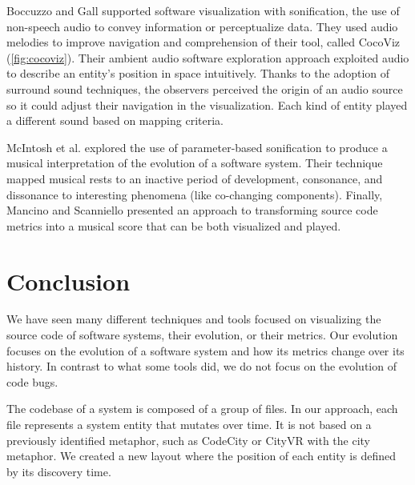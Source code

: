 Boccuzzo and Gall \cite{Boccuzzo2009} supported software visualization with sonification, the use of non-speech audio to convey information or perceptualize data. 
They used audio melodies to improve navigation and comprehension of their tool, called CocoViz (\autoref{fig:cocoviz}).
Their ambient audio software exploration approach exploited audio to describe an entity's position in space intuitively. 
Thanks to the adoption of surround sound techniques, the observers perceived the origin of an audio source so it could adjust their navigation in the visualization.
Each kind of entity played a different sound based on mapping criteria.



 
McIntosh et al. \cite{McIntosh2014} explored the use of parameter-based sonification to produce a musical interpretation of the evolution of a software system.
Their technique mapped musical rests to an inactive period of development, consonance, and dissonance to interesting phenomena (like co-changing components).
Finally, Mancino and Scanniello \cite{Mancino2017} presented an approach to transforming source code metrics into a musical score that can be both visualized and played. 


\section{Conclusion}

We have seen many different techniques and tools focused on visualizing the source code of software systems, their evolution, or their metrics.
Our evolution focuses on the evolution of a software system and how its metrics change over its history. 
In contrast to what some tools did, we do not focus on the evolution of code bugs.

The codebase of a system is composed of a group of files. In our approach, each file represents a system entity that mutates over time.
It is not based on a previously identified metaphor, such as CodeCity or CityVR with the city metaphor.
We created a new layout where the position of each entity is defined by its discovery time. 

